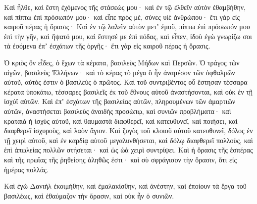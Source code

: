 {Καὶ ἦλθε, καὶ ἔστη ἐχόμενος τῆς στάσεώς μου· καὶ ἐν τῷ ἐλθεῖν αὐτὸν ἐθαμβήθην, καὶ πίπτω ἐπὶ πρόσωπόν μου· καὶ εἶπε πρὸς μὲ, σύνες υἱὲ ἀνθρώπου· ἔτι γὰρ εἰς καιροῦ πέρας ἡ ὅρασις·
Καὶ ἐν τῷ λαλεῖν αὐτὸν μετʼ ἐμοῦ, πίπτω ἐπὶ πρόσωπόν μου ἐπὶ τὴν γῆν, καὶ ἥψατό μου, καὶ ἔστησέ με ἐπὶ πόδας,
καὶ εἶπεν, ἰδοὺ ἐγὼ γνωρίζω σοι τὰ ἐσόμενα ἐπʼ ἐσχάτων τῆς ὀργῆς· ἔτι γὰρ εἰς καιροῦ πέρας ἡ ὅρασις.
\par }{\PP {}Ὁ κριὸς ὃν εἶδες, ὁ ἔχων τὰ κέρατα, βασιλεὺς Μήδων καὶ Περσῶν.
Ὁ τράγος τῶν αἰγῶν, βασιλεὺς Ἑλλήνων· καὶ τὸ κέρας τὸ μέγα ὃ ἦν ἀναμέσον τῶν ὀφθαλμῶν αὐτοῦ, αὐτός ἐστιν ὁ βασιλεὺς ὁ πρῶτος.
Καὶ τοῦ συντριβέντος οὗ ἔστησαν τέσσαρα κέρατα ὑποκάτω, τέσσαρες βασιλεῖς ἐκ τοῦ ἔθνους αὐτοῦ ἀναστήσονται, καὶ οὐκ ἐν τῇ ἰσχύϊ αὐτῶν.
Καὶ ἐπʼ ἐσχάτων τῆς βασιλείας αὐτῶν, πληρουμένων τῶν ἁμαρτιῶν αὐτῶν, ἀναστήσεται βασιλεὺς ἀναιδὴς προσώπῳ, καὶ συνιῶν προβλήματα·
καὶ κραταιὰ ἡ ἰσχὺς αὐτοῦ, καὶ θαυμαστὰ διαφθερεῖ, καὶ κατευθυνεῖ, καὶ ποιήσει, καὶ διαφθερεῖ ἰσχυροὺς, καὶ λαὸν ἅγιον.
Καὶ ζυγὸς τοῦ κλοιοῦ αὐτοῦ κατευθυνεῖ, δόλος ἐν τῇ χειρὶ αὐτοῦ, καὶ ἐν καρδίᾳ αὐτοῦ μεγαλυνθήσεται, καὶ δόλῳ διαφθερεῖ πολλοὺς, καὶ ἐπὶ ἀπωλείας πολλῶν στήσεται· καὶ ὡς ὠὰ χειρὶ συντρίψει.
Καὶ ἡ ὅρασις τῆς ἑσπέρας καὶ τῆς πρωΐας τῆς ῥηθείσης ἀληθῶς ἐστι· καὶ σὺ σφράγισον τὴν ὅρασιν, ὅτι εἰς ἡμέρας πολλάς.
\par }{\PP {}Καὶ ἐγὼ Δανιὴλ ἐκοιμήθην, καὶ ἐμαλακίσθην, καὶ ἀνέστην, καὶ ἐποίουν τὰ ἔργα τοῦ βασιλέως, καὶ ἐθαύμαζον τὴν ὅρασιν, καὶ οὐκ ἦν ὁ συνιῶν.

}
